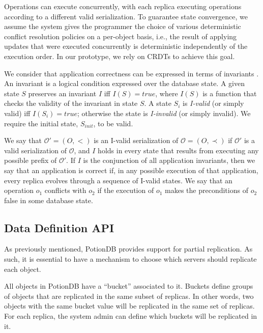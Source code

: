 \documentclass{vldb}
\begin{document}
Operations can execute concurrently, with each replica
executing operations according to a different valid
serialization.
To guarantee state convergence, we assume the system gives the programmer 
the choice of various deterministic conflict resolution policies
on a per-object basis, i.e., the result of
applying updates that were executed concurrently is deterministic
independently of the execution order.
In our prototype, we rely on CRDTs
\cite{crdts,walter} to achieve this goal.

We consider that application correctness can be expressed in
terms of invariants \cite{bailisiser,indigo,cise}.
An invariant is a logical condition expressed over the database
state.
A given state $S$ preserves an invariant $I$ iff $I(S) = \mathit{true}$,
where $I(S)$ is a function that checks the validity of the invariant in state $S$.
A state $S_i$ is \emph{I-valid} (or simply valid) iff $I(S_{i}) = \mathit{true}$; otherwise the state is
\emph{I-invalid} (or simply invalid).
We require the initial state, $S_{init}$, to be valid.

We say that $\mathcal{O'} = (O,<)$ is an I-valid serialization of \mbox{$\mathcal{O} = (O,\prec)$}
if $\mathcal{O'}$ is a valid serialization of $\mathcal{O}$, and $I$ holds in every state that
results from executing any possible prefix of $\mathcal{O'}$.
If $I$ is the conjunction of all application invariants, then we say that
an application is correct if, in any possible execution of that application,
every replica evolves through a sequence of I-valid states.
We say that an operation $o_1$ conflicts with $o_2$ if the execution of
$o_1$ makes the preconditions of $o_2$ false in some database state.





\subsection{Data Definition API}
\label{subsec:dataAPI}

As previously mentioned, PotionDB provides support for partial replication.
As such, it is essential to have a mechanism to choose which servers should replicate each object.

All objects in PotionDB have a ``bucket'' associated to it.
Buckets define groups of objects that are replicated in the same subset of replicas. In other words, two objects with the same bucket value will be replicated in the same set of replicas.
For each replica, the system admin can define which buckets will be replicated in it.
\end{document}
